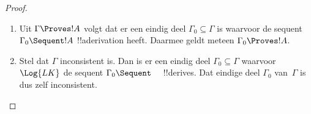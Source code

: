 \documentclass[../../../include/open-logic-section]{subfiles}
\begin{document}
\begin{proof}
  \begin{enumerate}
    \item Uit $\Gamma \Proves !A$ volgt dat er een eindig deel
      $\Gamma_0 \subseteq \Gamma$ is waarvoor de sequent $\Gamma_0
      \Sequent !A$ !!a{derivation} heeft. Daarmee geldt meteen
      $\Gamma_0 \Proves !A$.
    \item Stel dat $\Gamma$ inconsistent is. Dan is er een eindig deel
      $\Gamma_0 \subseteq \Gamma$ waarvoor $\Log{LK}$ de sequent
      $\Gamma_0 \Sequent \quad$ !!{derive}s. Dat eindige deel
      $\Gamma_0$ van~$\Gamma$ is dus zelf inconsistent.
  \end{enumerate}
\end{proof}
\end{document}
